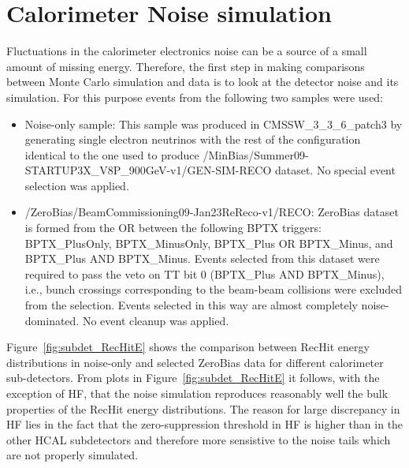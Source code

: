 \section{Calorimeter Noise simulation}
\label{sc:CaloNoise}

Fluctuations in the calorimeter electronics noise can be a source of a small amount of missing energy. Therefore, the first step
in making comparisons between Monte Carlo simulation and data is to look at the detector noise and its simulation. For this purpose
events from the following two samples were used:

\begin{itemize}
  \item Noise-only sample: \newline
This sample was produced in CMSSW\_3\_3\_6\_patch3 by generating single electron neutrinos with the rest of the configuration identical to the one used to
produce /MinBias/Summer09-STARTUP3X\_V8P\_900GeV-v1/GEN-SIM-RECO dataset. No special event selection was applied.

  \item /ZeroBias/BeamCommissioning09-Jan23ReReco-v1/RECO: \newline
ZeroBias dataset is formed from the OR between the following BPTX triggers: BPTX\_PlusOnly, BPTX\_MinusOnly, BPTX\_Plus
OR BPTX\_Minus, and BPTX\_Plus AND BPTX\_Minus. Events selected from this dataset were required to pass the
veto on TT bit 0 (BPTX\_Plus AND BPTX\_Minus), i.e., bunch crossings corresponding to the beam-beam
collisions were excluded from the selection. Events selected in this way are almost completely noise-dominated. No event cleanup was applied.
\end{itemize}

Figure~\ref{fig:subdet_RecHitE} shows the comparison between RecHit energy distributions in noise-only and selected ZeroBias data for different
calorimeter sub-detectors. From plots in Figure~\ref{fig:subdet_RecHitE} it follows, with the exception of HF, that
the noise simulation reproduces reasonably well the bulk properties of the RecHit energy distributions. The reason for large discrepancy in HF lies 
in the fact that the zero-suppression threshold in HF is higher than in the other HCAL subdetectors and therefore more sensistive to the noise tails
which are not properly simulated. 

